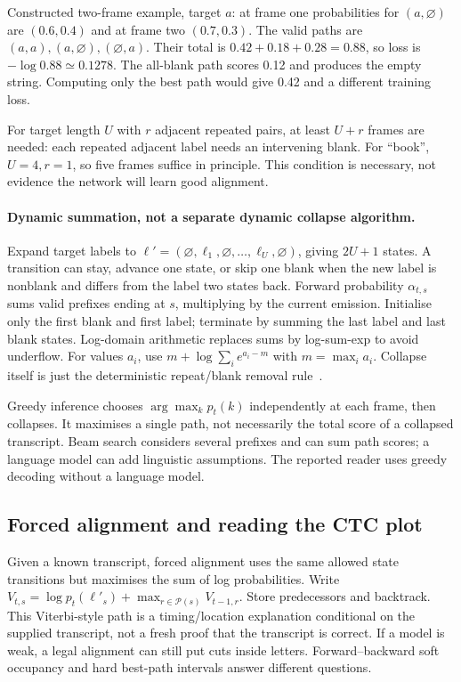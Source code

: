 Constructed two-frame example, target $a$: at frame one probabilities for
$(a,\varnothing)$ are $(0.6,0.4)$ and at frame two $(0.7,0.3)$.
The valid paths are $(a,a),(a,\varnothing),(\varnothing,a)$.
Their total is $0.42+0.18+0.28=0.88$, so loss is $-\log0.88\simeq0.1278$.
The all-blank path scores 0.12 and produces the empty string. Computing
only the best path would give 0.42 and a different training loss.

For target length $U$ with $r$ adjacent repeated pairs, at least $U+r$
frames are needed: each repeated adjacent label needs an intervening blank.
For ``book'', $U=4,r=1$, so five frames suffice in principle. This condition
is necessary, not evidence the network will learn good alignment.

\paragraph{Dynamic summation, not a separate dynamic collapse algorithm.}
Expand target labels to $\ell'=(\varnothing,\ell_1,\varnothing,\ldots,
\ell_U,\varnothing)$, giving $2U+1$ states. A transition can stay, advance
one state, or skip one blank when the new label is nonblank and differs
from the label two states back. Forward probability $\alpha_{t,s}$ sums
valid prefixes ending at $s$, multiplying by the current emission.
Initialise only the first blank and first label; terminate by summing the
last label and last blank states. Log-domain arithmetic replaces sums by
log-sum-exp to avoid underflow. For values $a_i$, use
$m+\log\sum_i e^{a_i-m}$ with $m=\max_i a_i$. Collapse itself is just
the deterministic repeat/blank removal rule~\cite{ctcdistill}.

Greedy inference chooses $\arg\max_k p_t(k)$ independently at each frame,
then collapses. It maximises a single path, not necessarily the total score
of a collapsed transcript. Beam search considers several prefixes and can
sum path scores; a language model can add linguistic assumptions. The
reported reader uses greedy decoding without a language model.

\subsection{Forced alignment and reading the CTC plot}
Given a known transcript, forced alignment uses the same allowed state
transitions but maximises the sum of log probabilities. Write
$V_{t,s}=\log p_t(\ell'_s)+\max_{r\in\mathcal P(s)}V_{t-1,r}$.
Store predecessors and backtrack. This Viterbi-style path is a timing/location
explanation conditional on the supplied transcript, not a fresh proof that
the transcript is correct. If a model is weak, a legal alignment can still
put cuts inside letters. Forward--backward soft occupancy and hard best-path
intervals answer different questions.

